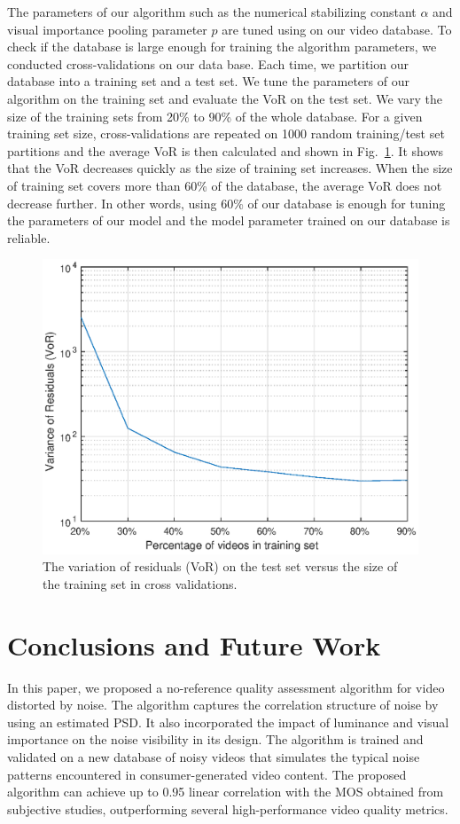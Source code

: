\documentclass{sig-alternate}
\begin{document}
The parameters of our algorithm such as the numerical stabilizing constant $\alpha$ and visual importance pooling parameter $p$ are tuned using on our video database. To check if the database is large enough for training the algorithm parameters, we conducted cross-validations on our data base. Each time, we partition our database into a training set and a test set. We tune the parameters of our algorithm on the training set and evaluate the VoR on the test set. We vary the size of the training sets from 20\% to 90\% of the whole database. For a given training set size, cross-validations are repeated on 1000 random training/test set partitions and the average VoR is then calculated and shown in Fig.~\ref{fig:cross_validation}. It shows that the VoR decreases quickly as the size of training set increases. When the size of training set covers more than 60\% of the database, the average VoR does not decrease further. In other words, using 60\% of our database is enough for tuning the parameters of our model and the model parameter trained on our database is reliable. 
\begin{figure}
\includegraphics[width=\columnwidth]{./img/cross_validation.eps}
\caption{\label{fig:cross_validation} The variation of residuals (VoR) on the test set versus the size of the training set in cross validations.}
\end{figure}

\section{Conclusions and Future Work}
\label{sec:conclusion}
In this paper, we proposed a no-reference quality assessment algorithm for video distorted by noise. The algorithm captures the correlation structure of noise by using an estimated PSD. It also incorporated the impact of luminance and visual importance on the noise visibility in its design. The algorithm is trained and validated on a new database of noisy videos that simulates the typical noise patterns encountered in consumer-generated video content. The proposed algorithm can achieve up to 0.95 linear correlation with the MOS obtained from subjective studies, outperforming several high-performance video quality metrics.
\end{document}
